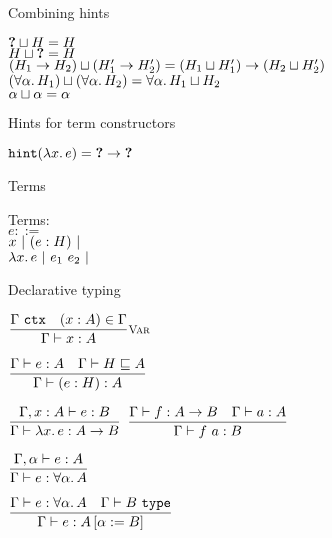 \documentclass{beamer}
\begin{document}
\begin{frame}{Combining hints}

\begin{center}
  $\combinehints{\Hole}{H} = H$ \\
  $\combinehints{H}{\Hole} = H$ \\
  $\combinehints{(\Fun{H_1}{H_2})}{(\Fun{H'_1}{H'_2})} = \Fun{(\combinehints{H_1}{H'_1})}{(\combinehints{H_2}{H'_2})}$ \\
  $\combinehints{(\ForallT{\alpha}{H_1})}{(\ForallT{\alpha}{H_2})} = \ForallT{\alpha}{\combinehints{H_1}{H_2}}$ \\
  $\combinehints{\alpha}{\alpha} = \alpha$
\end{center}

\end{frame}

\begin{frame}{Hints for term constructors}

\begin{center}
  $\hintfor{\fun{x}{e}} = \Fun{\Hole}{\Hole}$ \\
\end{center}

\end{frame}

\begin{frame}{Terms}

Terms: \\
$e ::=$ \\
\qquad $x \pipe \annot{e}{H} \pipe $ \\
\qquad $\fun{x}{e} \pipe \app{e_1}{e_2} \pipe$

\end{frame}

\begin{frame}{Declarative typing}

\begin{center}
  $\infrule[Var]{\tyctx{\Gamma} \quad \sidecond{(x : A) \in \Gamma}}{\typing{x}{A}}$

  \vspace{2em}

  $\infrule{\typing{e}{A} \quad \sidecond{\hintorderinctx{H}{A}}}{\typing{\annot{e}{H}}{A}}$

  \vspace{2em}

  $\infrule{\fulltyping{\extend{\Gamma}{x}{A}}{e}{B}}{\typing{\fun{x}{e}}{\Fun{A}{B}}}$ \quad
  $\infrule{\typing{f}{\Fun{A}{B}} \quad \typing{a}{A}}{\typing{\app{f}{a}}{B}}$

  \vspace{2em}

  $\infrule{\fulltyping{\extendtype{\Gamma}{\alpha}}{e}{A}}{\typing{e}{\ForallT{\alpha}{A}}}$

  \vspace{2em}

  $\infrule{\typing{e}{\ForallT{\alpha}{A}} \quad \type{B}}{\typing{e}{\subst{A}{\alpha}{B}}}$
\end{center}

\end{frame}
\end{document}
